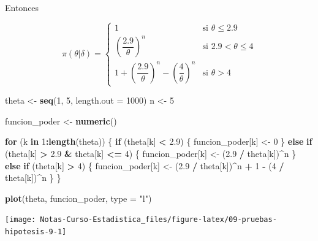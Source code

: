 \documentclass[
  12pt,
]{book}
\newenvironment{Shaded}{\begin{snugshade}}{\end{snugshade}}
\newcommand{\ControlFlowTok}[1]{\textcolor[rgb]{0.13,0.29,0.53}{\textbf{#1}}}
\newcommand{\DataTypeTok}[1]{\textcolor[rgb]{0.13,0.29,0.53}{#1}}
\newcommand{\DecValTok}[1]{\textcolor[rgb]{0.00,0.00,0.81}{#1}}
\newcommand{\FloatTok}[1]{\textcolor[rgb]{0.00,0.00,0.81}{#1}}
\newcommand{\KeywordTok}[1]{\textcolor[rgb]{0.13,0.29,0.53}{\textbf{#1}}}
\newcommand{\NormalTok}[1]{#1}
\newcommand{\OperatorTok}[1]{\textcolor[rgb]{0.81,0.36,0.00}{\textbf{#1}}}
\newcommand{\StringTok}[1]{\textcolor[rgb]{0.31,0.60,0.02}{#1}}
\begin{document}
Entonces

\[
\pi(\theta|\delta) = \begin{cases}1 & \text{si } \theta\leq 2.9 \\
\left(\dfrac{2.9}{\theta}\right)^n& \text{si } 2.9 <\theta\leq 4\\
1+\left(\dfrac{2.9}\theta\right)^n-\left(\dfrac{4}\theta\right)^n & \text{si } \theta >4\end{cases}
\]

\begin{Shaded}
\begin{Highlighting}[]
\NormalTok{theta \textless{}{-}}\StringTok{ }\KeywordTok{seq}\NormalTok{(}\DecValTok{1}\NormalTok{, }\DecValTok{5}\NormalTok{, }\DataTypeTok{length.out =} \DecValTok{1000}\NormalTok{)}
\NormalTok{n \textless{}{-}}\StringTok{ }\DecValTok{5}

\NormalTok{funcion\_poder \textless{}{-}}\StringTok{ }\KeywordTok{numeric}\NormalTok{()}

\ControlFlowTok{for}\NormalTok{ (k }\ControlFlowTok{in} \DecValTok{1}\OperatorTok{:}\KeywordTok{length}\NormalTok{(theta)) \{}
  \ControlFlowTok{if}\NormalTok{ (theta[k] }\OperatorTok{\textless{}}\StringTok{ }\FloatTok{2.9}\NormalTok{) \{}
\NormalTok{    funcion\_poder[k] \textless{}{-}}\StringTok{ }\DecValTok{0}
\NormalTok{  \} }\ControlFlowTok{else} \ControlFlowTok{if}\NormalTok{ (theta[k] }\OperatorTok{\textgreater{}}\StringTok{ }\FloatTok{2.9} \OperatorTok{\&}\StringTok{ }\NormalTok{theta[k] }\OperatorTok{\textless{}=}\StringTok{ }\DecValTok{4}\NormalTok{) \{}
\NormalTok{    funcion\_poder[k] \textless{}{-}}\StringTok{ }\NormalTok{(}\FloatTok{2.9} \OperatorTok{/}\StringTok{ }\NormalTok{theta[k])}\OperatorTok{\^{}}\NormalTok{n}
\NormalTok{  \} }\ControlFlowTok{else} \ControlFlowTok{if}\NormalTok{ (theta[k] }\OperatorTok{\textgreater{}}\StringTok{ }\DecValTok{4}\NormalTok{) \{}
\NormalTok{    funcion\_poder[k] \textless{}{-}}\StringTok{ }\NormalTok{(}\FloatTok{2.9} \OperatorTok{/}\StringTok{ }\NormalTok{theta[k])}\OperatorTok{\^{}}\NormalTok{n }\OperatorTok{+}\StringTok{ }\DecValTok{1} \OperatorTok{{-}}\StringTok{ }\NormalTok{(}\DecValTok{4} \OperatorTok{/}\StringTok{ }\NormalTok{theta[k])}\OperatorTok{\^{}}\NormalTok{n}
\NormalTok{  \}}
\NormalTok{\}}

\KeywordTok{plot}\NormalTok{(theta, funcion\_poder, }\DataTypeTok{type =} \StringTok{"l"}\NormalTok{)}
\end{Highlighting}
\end{Shaded}

\begin{center}\texttt{[image: Notas-Curso-Estadistica\_files/figure-latex/09-pruebas-hipotesis-9-1]} \end{center}
\end{document}
